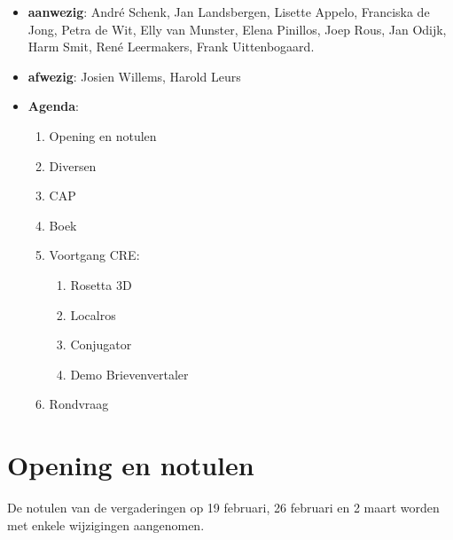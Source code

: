 
   \RosSupersedes{-}
   \MakeRosTitle



\begin{itemize}
  \item {\bf aanwezig}: Andr\'{e} Schenk, Jan Landsbergen, Lisette Appelo,
                     Franciska de Jong, Petra de Wit, Elly van Munster, 
                     Elena Pinillos, Joep Rous, Jan Odijk, Harm Smit,
                     Ren\'{e} Leermakers, Frank Uittenbogaard.

  \item {\bf afwezig}: Josien Willems, Harold Leurs 
  \item {\bf Agenda}:
    \begin{enumerate}
       \item Opening en notulen
       \item Diversen
       \item CAP
       \item Boek
       \item Voortgang CRE:
         \begin{enumerate} 
  	 \item Rosetta 3D
         \item Localros 
         \item Conjugator
         \item Demo Brievenvertaler
         \end{enumerate}
       \item Rondvraag
    \end{enumerate}
\end{itemize}

\section {Opening en notulen}
De notulen van de vergaderingen op 19 februari, 26 februari en 2 maart worden 
met enkele wijzigingen aangenomen.

